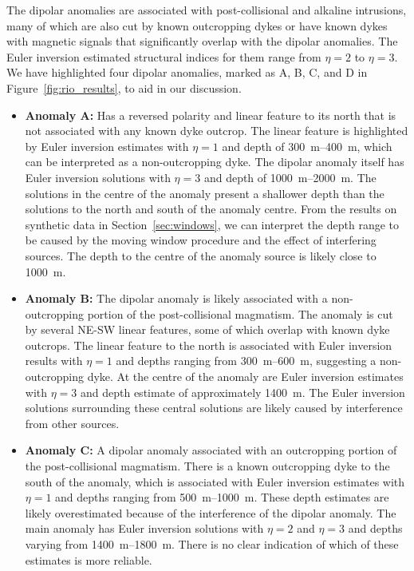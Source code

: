 The dipolar anomalies are associated with post-collisional and alkaline
intrusions, many of which are also cut by known outcropping dykes or have known
dykes with magnetic signals that significantly overlap with the dipolar
anomalies. The Euler inversion estimated structural indices for them range from
$\eta=2$ to $\eta=3$. We have highlighted four dipolar anomalies, marked as A,
B, C, and D in Figure~\ref{fig:rio_results}, to aid in our discussion.

\begin{itemize}
\item \textbf{Anomaly A:} Has a reversed polarity and linear feature to its
    north that is not associated with any known dyke outcrop. The linear
    feature is highlighted by Euler inversion estimates with $\eta=1$ and depth
    of \qtyrange{300}{400}{\m}, which can be interpreted as a non-outcropping
    dyke. The dipolar anomaly itself has Euler inversion solutions with
    $\eta=3$ and depth of \qtyrange{1000}{2000}{\m}.
    The solutions in the centre of the anomaly present a shallower depth than
    the solutions to the north and south of the anomaly centre. From the
    results on synthetic data in Section~\ref{sec:windows}, we can interpret
    the depth range to be caused by the moving window procedure and the effect
    of interfering sources. The depth to the centre of the anomaly source is
    likely close to \qty{1000}{\m}.

\item \textbf{Anomaly B:} The dipolar anomaly is likely associated with
    a non-outcropping portion of the post-collisional magmatism. The anomaly is
    cut by several NE-SW linear features, some of which overlap with known dyke
    outcrops. The linear feature to the north is associated with Euler
    inversion results with $\eta=1$ and depths ranging from
    \qtyrange{300}{600}{\m}, suggesting a non-outcropping dyke. At the centre
    of the anomaly are Euler inversion estimates with $\eta=3$ and depth
    estimate of approximately \qty{1400}{\m}. The Euler inversion solutions
    surrounding these central solutions are likely caused by interference from
    other sources.

\item \textbf{Anomaly C:} A dipolar anomaly associated with an outcropping
    portion of the post-collisional magmatism. There is a known outcropping
    dyke to the south of the anomaly, which is associated with Euler inversion
    estimates with $\eta=1$ and depths ranging from \qtyrange{500}{1000}{\m}.
    These depth estimates are likely overestimated because of the interference
    of the dipolar anomaly. The main anomaly has Euler inversion solutions with
    $\eta=2$ and $\eta=3$ and depths varying from \qtyrange{1400}{1800}{\m}.
    There is no clear indication of which of these estimates is more reliable.


\end{itemize}
